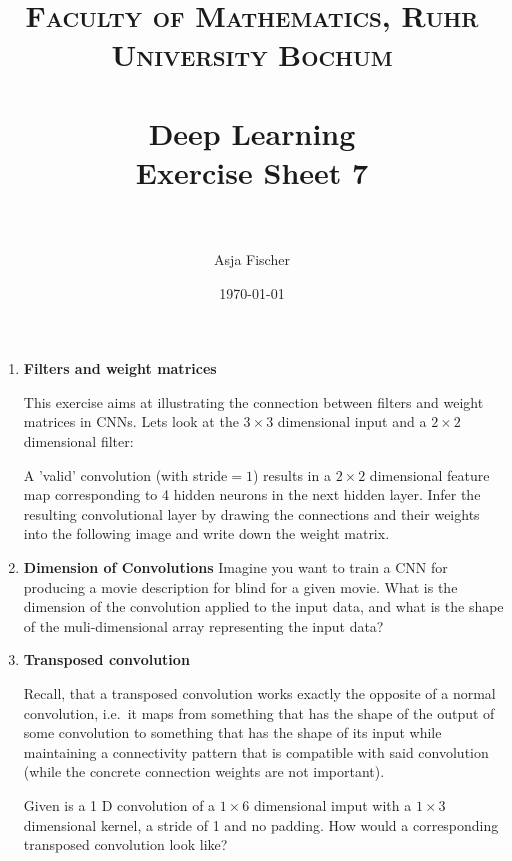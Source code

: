 \documentclass[paper=a4, fontsize=11pt,dvipsnames]{scrartcl} %
\title{	
\normalfont \normalsize 
\textsc{Faculty of Mathematics, Ruhr University Bochum} \\ [25pt] %
\horrule{0.5pt} \\[0.4cm] %
\huge Deep Learning\\{\Large Exercise Sheet 7}\\ %
\horrule{2pt} \\[0.5cm] %
}
\author{Asja Fischer} %
\date{\normalsize\today} %
\numberwithin{equation}{section} %
\numberwithin{figure}{section} %
\numberwithin{table}{section} %
\begin{document}
\maketitle %
\begin{enumerate} 

\item \textbf{Filters and weight matrices}

This exercise aims at illustrating the connection between filters and weight matrices in CNNs.
Lets look at the $3\times 3$ dimensional input and  a $2\times 2$  dimensional filter:


\begin{figure}[H]
	\center
	
	\vspace{-.25cm}
\end{figure}

A 'valid' convolution (with stride$=1$) results in a $2\times 2$ dimensional feature map corresponding to 4 hidden neurons in the next hidden layer. Infer the resulting convolutional layer by drawing the connections and their weights into the following image and write down the weight matrix. 



\begin{figure}[H]
	\center
	
	\vspace{-.25cm}
\end{figure}


\item \textbf{Dimension of Convolutions}
Imagine you want to train a CNN for producing a movie description for blind for a given movie. What is the dimension   of the convolution applied to the input data, and what is the shape of the muli-dimensional array representing the input data? 

\item \textbf{Transposed convolution}

Recall, that a transposed convolution works exactly the opposite of a normal convolution, i.e.~it maps from something that has the shape of the output of some convolution to something that has the shape of its input while maintaining a connectivity pattern that is compatible with said convolution (while the concrete connection weights are not important).

Given is a 1 D convolution of a $1\times 6$ dimensional imput 
with a $1 \times 3$ dimensional kernel, a stride of 1 and no padding. How would a corresponding transposed convolution look like? 

\end{enumerate}




\end{document}
